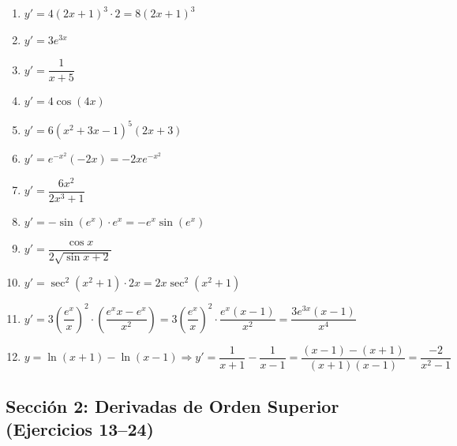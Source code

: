 \documentclass[12pt, letterpaper]{article}
\begin{document}
\begin{enumerate}[series=respuestas, leftmargin=*, label=\textbf{\arabic*.}]
  \item $y' = 4(2x + 1)^3 \cdot 2 = 8(2x + 1)^3$
  \item $y' = 3e^{3x}$
  \item $y' = \dfrac{1}{x + 5}$
  \item $y' = 4\cos(4x)$
  \item $y' = 6(x^2 + 3x - 1)^5(2x + 3)$
  \item $y' = e^{-x^2}(-2x) = -2x e^{-x^2}$
  \item $y' = \dfrac{6x^2}{2x^3 + 1}$
  \item $y' = -\sin(e^x) \cdot e^x = -e^x \sin(e^x)$
  \item $y' = \dfrac{\cos x}{2\sqrt{\sin x + 2}}$
  \item $y' = \sec^2(x^2 + 1) \cdot 2x = 2x \sec^2(x^2 + 1)$
  \item $y' = 3\left(\dfrac{e^x}{x}\right)^2 \cdot \left(\dfrac{e^x x - e^x}{x^2}\right) = 3\left(\dfrac{e^x}{x}\right)^2 \cdot \dfrac{e^x(x - 1)}{x^2} = \dfrac{3e^{3x}(x - 1)}{x^4}$
  \item $y = \ln(x + 1) - \ln(x - 1) \Rightarrow y' = \dfrac{1}{x + 1} - \dfrac{1}{x - 1} = \dfrac{(x - 1) - (x + 1)}{(x + 1)(x - 1)} = \dfrac{-2}{x^2 - 1}$
\end{enumerate}


\subsection*{Sección 2: Derivadas de Orden Superior (Ejercicios 13--24)}
\end{document}
